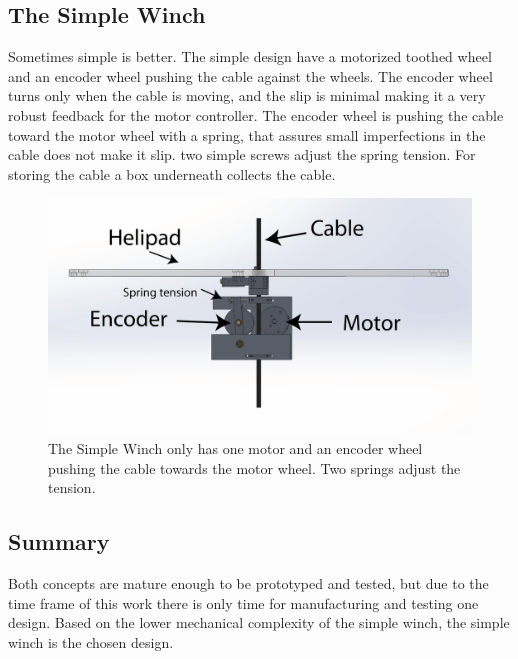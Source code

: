 
\subsection{The Simple Winch}
Sometimes simple is better. The simple design have a motorized toothed wheel and an encoder wheel pushing the cable against the wheels. The encoder wheel turns only when the cable is moving, and the slip is minimal making it a very robust feedback for the motor controller. The encoder wheel is pushing the cable toward the motor wheel with a spring, that assures small imperfections in the cable does not make it slip. two simple screws adjust the spring tension. For storing the cable a box underneath collects the cable.

\begin{figure}[H]
\centering
\includegraphics[scale=0.75]{graphics/cad/winch.png}
\caption[The Simple Winch]{The Simple Winch only has one motor and an encoder wheel pushing the cable towards the motor wheel. Two springs adjust the tension.}
\label{fig:winch}
\end{figure}

\subsection{Summary}
Both concepts are mature enough to be prototyped and tested, but due to the time frame of this work there is only time for manufacturing and testing one design. Based on the lower mechanical complexity of the simple winch, the simple winch is the chosen design.    


